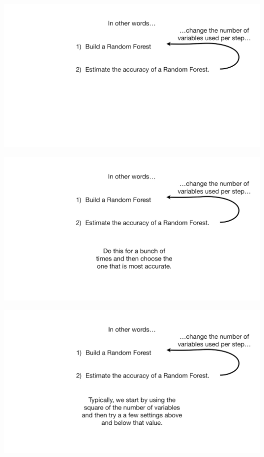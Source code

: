 \documentclass[
  ignorenonframetext,
]{beamer}
\begin{document}
\begin{frame}{}
\protect\hypertarget{section-95}{}
\includegraphics{images/r96.png}
\end{frame}

\begin{frame}{}
\protect\hypertarget{section-96}{}
\includegraphics{images/r97.png}
\end{frame}

\begin{frame}{}
\protect\hypertarget{section-97}{}
\includegraphics{images/r98.png}
\end{frame}
\end{document}
